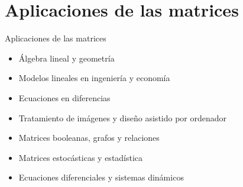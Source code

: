 \documentclass[
  ignorenonframetext,
]{beamer}
\providecommand{\tightlist}{%
  \setlength{\itemsep}{0pt}\setlength{\parskip}{0pt}}
\begin{document}
\hypertarget{aplicaciones-de-las-matrices}{%
\section{Aplicaciones de las
matrices}\label{aplicaciones-de-las-matrices}}

\begin{frame}{Aplicaciones de las matrices}
\protect\hypertarget{aplicaciones-de-las-matrices-1}{}
\begin{itemize}
\tightlist
\item
  Álgebra lineal y geometría
\item
  Modelos lineales en ingeniería y economía
\item
  Ecuaciones en diferencias
\item
  Tratamiento de imágenes y diseño asistido por ordenador
\item
  Matrices booleanas, grafos y relaciones
\item
  Matrices estocásticas y estadística
\item
  Ecuaciones diferenciales y sistemas dinámicos
\end{itemize}
\end{frame}
\end{document}

